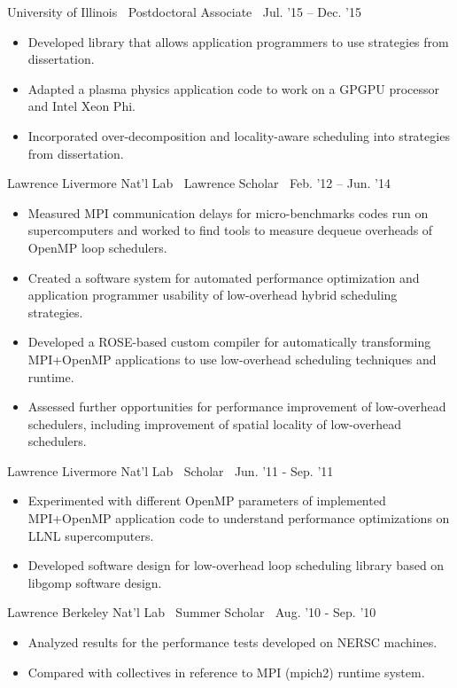 { University of Illinois$\>$$\>$$\>$$\>$Postdoctoral Associate$\>$$\>$$\>$$\>$Jul. '15 – Dec. '15}
\vspace*{-0.0in}
\begin{itemize} 
\item Developed library that allows application programmers to use strategies from dissertation.
\item Adapted a plasma physics application code to work on a
GPGPU processor and Intel Xeon Phi.
\item Incorporated over-decomposition and locality-aware scheduling into strategies from dissertation.
\end{itemize}

{Lawrence Livermore Nat’l Lab$\>$$\>$$\>$$\>$Lawrence Scholar$\>$$\>$$\>$$\>$Feb. '12 – Jun. '14}
\vspace*{-0.0in}
\begin{itemize} 
\item Measured MPI communication delays for micro-benchmarks codes run on supercomputers and worked to find tools to measure dequeue overheads of OpenMP loop schedulers.
\item Created a software system for automated performance optimization and application programmer usability of low-overhead hybrid scheduling
strategies.
\item Developed a ROSE-based custom compiler for automatically transforming MPI+OpenMP applications to use low-overhead scheduling
techniques and runtime.
\item Assessed further opportunities for performance improvement of low-overhead schedulers, including improvement of spatial locality
of low-overhead schedulers.
\end{itemize}

{Lawrence Livermore Nat’l Lab$\>$$\>$$\>$$\>$Scholar$\>$$\>$$\>$$\>$Jun. '11 - Sep. '11}
\vspace*{-0.0in}
\begin{itemize} 
\item Experimented with different OpenMP parameters of implemented MPI+OpenMP application code to understand performance optimizations on
LLNL supercomputers.
\item Developed software design for low-overhead loop scheduling library based on libgomp software design.
\end{itemize} 

{Lawrence Berkeley Nat’l Lab$\>$$\>$$\>$$\>$Summer Scholar$\>$$\>$$\>$$\>$Aug. '10 - Sep. '10}
\begin{itemize}
\item Analyzed results for the performance tests developed on NERSC machines.
\item Compared with collectives in reference to MPI (mpich2) runtime system.
\end{itemize}

